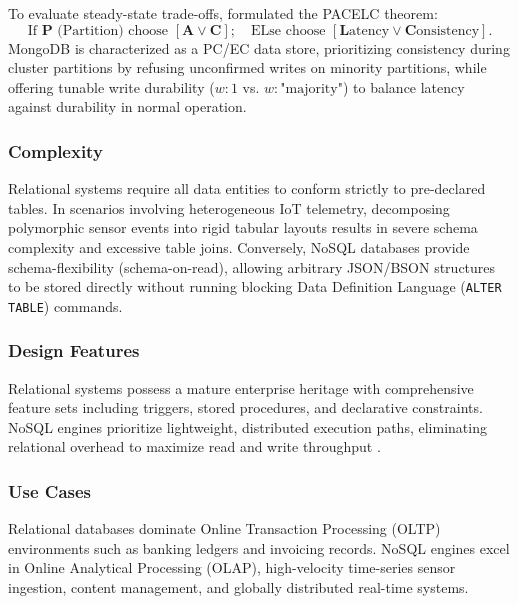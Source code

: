 \documentclass[11pt,a4paper]{article}
\begin{document}
To evaluate steady-state trade-offs, \citet{abadi2012} formulated the PACELC theorem:
\begin{equation}
    \text{If } \mathbf{P} \text{ (Partition) choose } [\mathbf{A} \lor \mathbf{C}]; \quad \text{EL} \text{se choose } [\mathbf{L} \text{atency} \lor \mathbf{C} \text{onsistency}].
\end{equation}
MongoDB is characterized as a PC/EC data store, prioritizing consistency during cluster partitions by refusing unconfirmed writes on minority partitions, while offering tunable write durability ($w: 1$ vs. $w: \text{"majority"}$) to balance latency against durability in normal operation.

\subsubsection*{Complexity}
Relational systems require all data entities to conform strictly to pre-declared tables. In scenarios involving heterogeneous IoT telemetry, decomposing polymorphic sensor events into rigid tabular layouts results in severe schema complexity and excessive table joins. Conversely, NoSQL databases provide schema-flexibility (schema-on-read), allowing arbitrary JSON/BSON structures to be stored directly without running blocking Data Definition Language (\texttt{ALTER TABLE}) commands.

\subsubsection*{Design Features}
Relational systems possess a mature enterprise heritage with comprehensive feature sets including triggers, stored procedures, and declarative constraints. NoSQL engines prioritize lightweight, distributed execution paths, eliminating relational overhead to maximize read and write throughput \citep{leavitt2010}.

\subsubsection*{Use Cases}
Relational databases dominate Online Transaction Processing (OLTP) environments such as banking ledgers and invoicing records. NoSQL engines excel in Online Analytical Processing (OLAP), high-velocity time-series sensor ingestion, content management, and globally distributed real-time systems.
\end{document}
